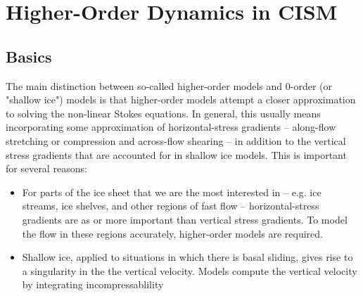 %
%
%
%
%

\section{Higher-Order Dynamics in CISM}

\subsection{Basics}
The main distinction between so-called higher-order models and 0-order (or "shallow ice") models is that higher-order models attempt a closer approximation to solving the non-linear Stokes equations. In general, this usually means incorporating some approximation of horizontal-stress gradients -- along-flow stretching or compression and across-flow shearing -- in addition to the vertical stress gradients that are accounted for in shallow ice models. This is important for several reasons:


\begin{itemize}
\item For parts of the ice sheet that we are the most interested in -- e.g. ice streams, ice shelves, and other regions of fast flow -- horizontal-stress gradients are as or more important than vertical stress gradients. To model the flow in these regions accurately, higher-order models are required.
\item Shallow ice, applied to situations in which there is basal sliding, gives rise to a singularity in the the vertical velocity. Models compute the vertical velocity by integrating incompressablility
\end{itemize}

